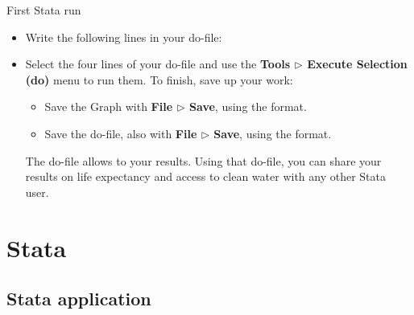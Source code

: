 \documentclass{beamer}
\begin{document}
	\begin{frame}[t]{First Stata run}
	
	\begin{itemize}
		\item Write the following lines in your do-file:
		
		
				
		
		
		\item Select the four lines of your do-file and use the \textbf{Tools $\triangleright$ Execute Selection (do)} menu to run them. To finish, save up your work:
		
		\begin{itemize}
			\item Save the Graph with \textbf{File $\triangleright$ Save}, using the  format.
			\item Save the do-file, also with \textbf{File $\triangleright$ Save}, using the  format.
		\end{itemize}
		
		The do-file allows to  your results. Using that do-file, you can share your results on life expectancy and access to clean water with any other Stata user.
	\end{itemize} 
			
	\end{frame}
	
	\section{Stata}

	\subsection{Stata application}
\end{document}
